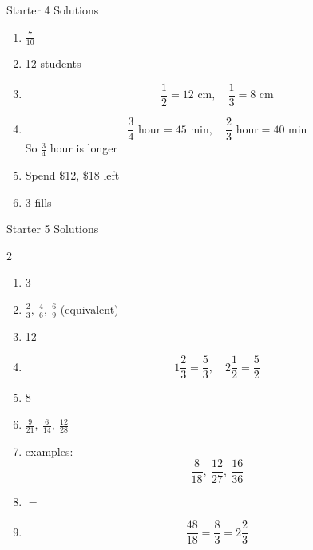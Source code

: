 \documentclass{beamer}
\begin{document}
\begin{frame}{Starter 4 Solutions}

\begin{enumerate}
\item $\frac{7}{10}$
\item 12 students
\item 
\[
\frac{1}{2}=12\text{ cm},\quad \frac{1}{3}=8\text{ cm}
\]
\item 
\[
\frac{3}{4}\text{ hour}=45\text{ min},\quad \frac{2}{3}\text{ hour}=40\text{ min}
\]
So $\frac{3}{4}$ hour is longer
\item Spend \$12, \$18 left
\item 3 fills
\end{enumerate}

\end{frame}



\begin{frame}{Starter 5 Solutions}

\begin{multicols}{2}

\begin{enumerate}

\item 3

\item $\frac{2}{3},\ \frac{4}{6},\ \frac{6}{9}$ (equivalent)

\item 12

\item 
\[
1\frac{2}{3}=\frac{5}{3},\quad 2\frac{1}{2}=\frac{5}{2}
\]

\item 8

\columnbreak

\item $\frac{9}{21},\ \frac{6}{14},\ \frac{12}{28}$

\item examples:
\[
\frac{8}{18},\ \frac{12}{27},\ \frac{16}{36}
\]

\item $=$

\item 
\[
\frac{48}{18}=\frac{8}{3}=2\frac{2}{3}
\]

\end{enumerate}

\end{multicols}

\end{frame}
\end{document}
